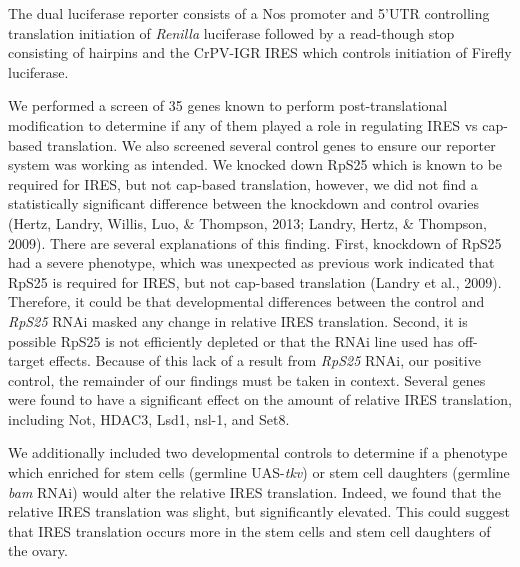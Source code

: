 \documentclass[12pt,oneside]{reedthesis}
\begin{document}
\setlength\parindent{0pt}The dual luciferase reporter consists of a Nos promoter and 5'UTR controlling translation initiation of \emph{Renilla} luciferase followed by a read-though stop consisting of hairpins and the CrPV-IGR IRES which controls initiation of Firefly luciferase.

\setlength\parindent{24pt}

We performed a screen of 35 genes known to perform post-translational
modification to determine if any of them played a role in regulating
IRES vs cap-based translation. We also screened several control genes to
ensure our reporter system was working as intended. We knocked down
RpS25 which is known to be required for IRES, but not cap-based
translation, however, we did not find a statistically significant
difference between the knockdown and control ovaries
(Hertz, Landry, Willis, Luo, \& Thompson, 2013; Landry, Hertz, \& Thompson, 2009). There are several
explanations of this finding. First, knockdown of RpS25 had a severe
phenotype, which was unexpected as previous work indicated that RpS25 is
required for IRES, but not cap-based translation
(Landry et al., 2009). Therefore, it could be that
developmental differences between the control and \emph{RpS25} RNAi masked any
change in relative IRES translation. Second, it is possible RpS25 is not
efficiently depleted or that the RNAi line used has off-target effects.
Because of this lack of a result from \emph{RpS25} RNAi, our positive control,
the remainder of our findings must be taken in context. Several genes
were found to have a significant effect on the amount of relative IRES
translation, including Not, HDAC3, Lsd1, nsl-1, and Set8.

We additionally included two developmental controls to determine if a
phenotype which enriched for stem cells (germline UAS-\emph{tkv}) or stem cell
daughters (germline \emph{bam} RNAi) would alter the relative IRES translation.
Indeed, we found that the relative IRES translation was slight, but
significantly elevated. This could suggest that IRES translation occurs
more in the stem cells and stem cell daughters of the ovary.
\end{document}
